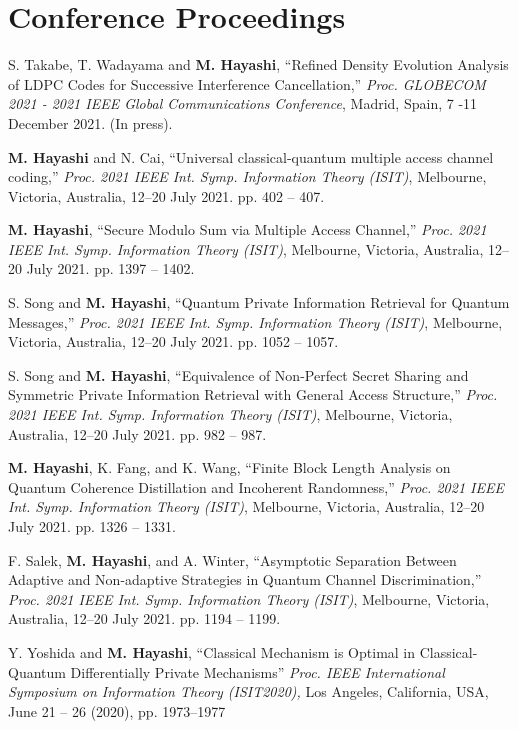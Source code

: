 \documentclass[a4paper,12pt,oneside]{article}
\begin{document}
\section{Conference Proceedings}
\begin{enumerate}
S. Takabe, T. Wadayama and \textbf{M. Hayashi},
``Refined Density Evolution Analysis of LDPC Codes for Successive Interference Cancellation,''
{\em Proc. GLOBECOM 2021 - 2021 IEEE Global Communications Conference}, 
Madrid, Spain, 7 -11 December 2021. (In press).

\textbf{M. Hayashi} and N. Cai, 
``Universal classical-quantum multiple access channel
coding,''
{\em Proc. 2021 IEEE Int. Symp. Information Theory (ISIT)}, 
Melbourne, Victoria, Australia, 12–20 July 2021. pp. 402 -- 407.

\textbf{M. Hayashi}, 
``Secure Modulo Sum via Multiple Access Channel,''
{\em Proc. 2021 IEEE Int. Symp. Information Theory (ISIT)}, 
Melbourne, Victoria, Australia, 12–20 July 2021. pp. 1397 -- 1402.

S. Song and \textbf{M. Hayashi}, 
``Quantum Private Information Retrieval for Quantum Messages,''
{\em Proc. 2021 IEEE Int. Symp. Information Theory (ISIT)}, 
Melbourne, Victoria, Australia, 12–20 July 2021.  pp. 1052 -- 1057.

S. Song and \textbf{M. Hayashi}, 
``Equivalence of Non-Perfect Secret Sharing and Symmetric Private Information Retrieval with General Access Structure,''
{\em Proc. 2021 IEEE Int. Symp. Information Theory (ISIT)}, 
Melbourne, Victoria, Australia, 12–20 July 2021. pp. 982 -- 987.

\textbf{M. Hayashi}, K. Fang, and K. Wang,
``Finite Block Length Analysis on Quantum
Coherence Distillation and Incoherent Randomness,''
{\em Proc. 2021 IEEE Int. Symp. Information Theory (ISIT)}, 
Melbourne, Victoria, Australia, 12–20 July 2021. pp. 1326 -- 1331.

F. Salek, \textbf{M. Hayashi}, and A. Winter, 
``Asymptotic Separation Between Adaptive and Non-adaptive Strategies in Quantum Channel Discrimination,''
{\em Proc. 2021 IEEE Int. Symp. Information Theory (ISIT)}, 
Melbourne, Victoria, Australia, 12–20 July 2021. pp. 1194 -- 1199.

Y. Yoshida and \textbf{M. Hayashi}, 
``Classical Mechanism is Optimal in Classical-Quantum Differentially Private Mechanisms''
{\em Proc. IEEE International Symposium on Information Theory (ISIT2020),} 
Los Angeles, California, USA, June 21 -- 26 (2020), pp. 1973--1977


\end{enumerate}
\end{document}
